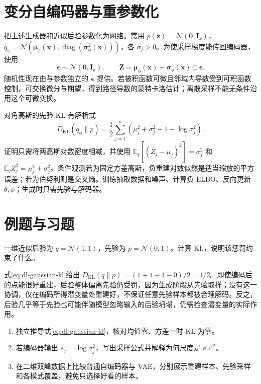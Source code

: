 \documentclass[UTF8,12pt,a4paper,fontset=fandol]{ctexbook}
\begin{document}
\section{变分自编码器与重参数化}
把上述生成器和近似后验参数化为网络\cite{kingma2013}。常用 $p(\mathbf z)=\mathcal N(\mathbf0,\mathbf I_k)$，$q_\phi=\mathcal N(\boldsymbol\mu_\phi(\mathbf x),\operatorname{diag}(\boldsymbol\sigma_\phi^2(\mathbf x)))$，各 $\sigma_j>0$。为使采样梯度能传回编码器，使用
\[
\boldsymbol\epsilon\sim\mathcal N(\mathbf0,\mathbf I_k),\qquad
\mathbf Z=\boldsymbol\mu_\phi(\mathbf x)+\boldsymbol\sigma_\phi(\mathbf x)\odot\boldsymbol\epsilon.
\]
随机性现在由与参数独立的 $\boldsymbol\epsilon$ 提供。若被积函数可微且邻域内导数受到可积函数控制，可交换微分与期望，得到路径导数的蒙特卡洛估计；离散采样不能无条件沿用这个可微变换。

对角高斯的先验 KL 有解析式
\begin{equation}
D_{\mathrm{KL}}(q_\phi\|p)=\frac12\sum_{j=1}^k(\mu_j^2+\sigma_j^2-1-\log\sigma_j^2).
\label{eq:dl-gaussian-kl}
\end{equation}
证明只需将两高斯对数密度相减，并使用 $\mathbb E_q[(Z_j-\mu_j)^2]=\sigma_j^2$ 和 $\mathbb E_qZ_j^2=\mu_j^2+\sigma_j^2$。条件观测若为固定方差高斯，负重建对数似然是适当缩放的平方误差；若为伯努利则是交叉熵。训练抽取数据和噪声、计算负 ELBO、反向更新 $\theta,\phi$；生成时只需先验与解码器。

\section{例题与习题}
\begin{example}[重建好不等于从先验生成好]
一维近似后验为 $q=\mathcal N(1,1)$，先验为 $p=\mathcal N(0,1)$。计算 KL，说明该惩罚约束了什么。
\end{example}
\begin{solve}
式\eqref{eq:dl-gaussian-kl}给出 $D_{\mathrm{KL}}(q\|p)=(1+1-1-0)/2=1/2$。即使编码后的点能很好重建，后验整体偏离先验仍受罚，因为生成阶段从先验取样；没有这一协调，仅在编码所得潜变量处重建好，不保证任意先验样本都被合理解码。反之，后验几乎等于先验也可能伴随模型忽略输入的后验坍塌，仍需检查潜变量的实际作用。
\end{solve}
\begin{enumerate}
\item 独立推导式\eqref{eq:dl-gaussian-kl}，核对均值零、方差一时 KL 为零。
\item 若编码器输出 $s_j=\log\sigma_j^2$，写出采样公式并解释为何尺度是 $e^{s_j/2}$。
\item 在二维双峰数据上比较普通自编码器与 VAE，分别展示重建样本、先验采样和各模式覆盖，避免只选择好看的样本。
\end{enumerate}
\end{document}
